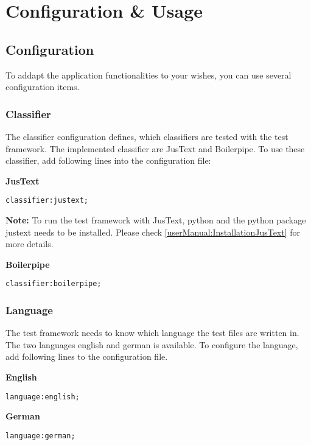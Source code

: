 \section{Configuration \& Usage}

\subsection{Configuration}

To addapt the application functionalities to your wishes, you can use several configuration items.

\subsubsection{Classifier}

The classifier configuration defines, which classifiers are tested with the test framework. The implemented classifier are JusText and Boilerpipe.
To use these classifier, add following lines into the configuration file:

\textbf{JusText}

\begin{lstlisting}
classifier:justext;
\end{lstlisting}

\textbf{Note:} To run the test framework with JusText, python and the python package justext needs to be installed. Please check \ref{userManual:InstallationJusText} for more details.


\textbf{Boilerpipe}

\begin{lstlisting}
classifier:boilerpipe;
\end{lstlisting}


\subsubsection{Language}

The test framework needs to know which language the test files are written in. The two languages english and german is available. To configure the language, add following lines to the configuration file.

\textbf{English}
\begin{lstlisting}
language:english;
\end{lstlisting}

\textbf{German}
\begin{lstlisting}
language:german;
\end{lstlisting}

